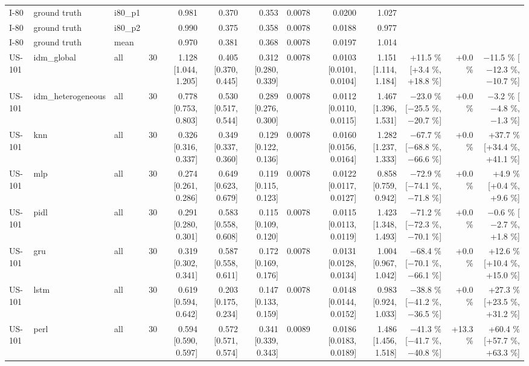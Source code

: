 \begin{table}[htbp]
{\begin{tabular}{lllrrrrrrrrrr}
I-80 & ground truth & i80\_p1 &  & 0.981 & 0.370 & 0.353 & 0.0078 & 0.0200 & 1.027 &  &  &  \\
I-80 & ground truth & i80\_p2 &  & 0.990 & 0.375 & 0.358 & 0.0078 & 0.0188 & 0.977 &  &  &  \\
I-80 & ground truth & mean &  & 0.970 & 0.381 & 0.368 & 0.0078 & 0.0197 & 1.014 &  &  &  \\
US-101 & idm\_global & all & 30 & 1.128 [1.044, 1.205] & 0.405 [0.370, 0.445] & 0.312 [0.280, 0.339] & 0.0078 & 0.0103 [0.0101, 0.0104] & 1.151 [1.114, 1.184] & +11.5 \% [+3.4 \%, +18.8 \%] & +0.0 \% & $-$11.5 \% [$-$12.3 \%, $-$10.7 \%] \\
US-101 & idm\_heterogeneous & all & 30 & 0.778 [0.753, 0.803] & 0.530 [0.517, 0.544] & 0.289 [0.276, 0.300] & 0.0078 & 0.0112 [0.0110, 0.0115] & 1.467 [1.396, 1.531] & $-$23.0 \% [$-$25.5 \%, $-$20.7 \%] & +0.0 \% & $-$3.2 \% [$-$4.8 \%, $-$1.3 \%] \\
US-101 & knn & all & 30 & 0.326 [0.316, 0.337] & 0.349 [0.337, 0.360] & 0.129 [0.122, 0.136] & 0.0078 & 0.0160 [0.0156, 0.0164] & 1.282 [1.237, 1.333] & $-$67.7 \% [$-$68.8 \%, $-$66.6 \%] & +0.0 \% & +37.7 \% [+34.4 \%, +41.1 \%] \\
US-101 & mlp & all & 30 & 0.274 [0.261, 0.286] & 0.649 [0.623, 0.679] & 0.119 [0.115, 0.123] & 0.0078 & 0.0122 [0.0117, 0.0127] & 0.858 [0.759, 0.942] & $-$72.9 \% [$-$74.1 \%, $-$71.8 \%] & +0.0 \% & +4.9 \% [+0.4 \%, +9.6 \%] \\
US-101 & pidl & all & 30 & 0.291 [0.280, 0.301] & 0.583 [0.558, 0.608] & 0.115 [0.109, 0.120] & 0.0078 & 0.0115 [0.0113, 0.0119] & 1.423 [1.348, 1.493] & $-$71.2 \% [$-$72.3 \%, $-$70.1 \%] & +0.0 \% & $-$0.6 \% [$-$2.7 \%, +1.8 \%] \\
US-101 & gru & all & 30 & 0.319 [0.302, 0.341] & 0.587 [0.558, 0.611] & 0.172 [0.169, 0.176] & 0.0078 & 0.0131 [0.0128, 0.0134] & 1.004 [0.967, 1.042] & $-$68.4 \% [$-$70.1 \%, $-$66.1 \%] & +0.0 \% & +12.6 \% [+10.4 \%, +15.0 \%] \\
US-101 & lstm & all & 30 & 0.619 [0.594, 0.642] & 0.203 [0.175, 0.234] & 0.147 [0.133, 0.159] & 0.0078 & 0.0148 [0.0144, 0.0152] & 0.983 [0.924, 1.033] & $-$38.8 \% [$-$41.2 \%, $-$36.5 \%] & +0.0 \% & +27.3 \% [+23.5 \%, +31.2 \%] \\
US-101 & perl & all & 30 & 0.594 [0.590, 0.597] & 0.572 [0.571, 0.574] & 0.341 [0.339, 0.343] & 0.0089 & 0.0186 [0.0183, 0.0189] & 1.486 [1.456, 1.518] & $-$41.3 \% [$-$41.7 \%, $-$40.8 \%] & +13.3 \% & +60.4 \% [+57.7 \%, +63.3 \%] \\

\end{tabular}}
\end{table}
